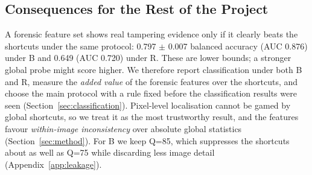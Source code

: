 \subsection{Consequences for the Rest of the Project}\label{sec:leakage-consequences}

A forensic feature set shows real tampering evidence only if it clearly beats the shortcuts under the same
protocol: 0.797 $\pm$ 0.007 balanced accuracy (AUC 0.876) under B and 0.649 (AUC 0.720) under R. These are lower
bounds; a stronger global probe might score higher. We therefore report classification under both B and R,
measure the \emph{added value} of the forensic features over the shortcuts, and choose the main protocol with a
rule fixed before the classification results were seen (Section~\ref{sec:classification}). Pixel-level
localisation cannot be gamed by global shortcuts, so we treat it as the most trustworthy result, and the features
favour \emph{within-image inconsistency} over absolute global statistics (Section~\ref{sec:method}). For B we keep
Q=85, which suppresses the shortcuts about as well as Q=75 while discarding less image detail
(Appendix~\ref{app:leakage}).
